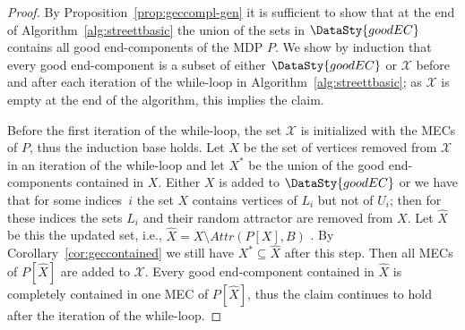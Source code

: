 \documentclass[11pt,letterpaper]{article}
\newcommand{\at}{\mathit{Attr}}
\newcommand{\mdp}{P\xspace}
\newcommand{\ec}{X\xspace}
\newcommand{\good}{\DataSty{goodEC}}
\newcommand{\badv}{B\xspace}
\begin{document}
\begin{proof}
	By Proposition~\ref{prop:geccompl-gen} it is sufficient to show that at the end of 
	Algorithm~\ref{alg:streettbasic} the union of the sets in $\good$ contains
	all good end-components of the MDP $\mdp$. We show by induction that 
	every good end-component is a subset of either 
	$\good$ or $\mathcal{\ec}$ before and after each iteration of the while-loop
	in Algorithm~\ref{alg:streettbasic}; as $\mathcal{\ec}$ is empty at the 
	end of the algorithm, this implies the claim.
	
	Before the first iteration of the while-loop, the 
	set $\mathcal{\ec}$ is initialized with the MECs of $\mdp$, thus the induction 
	base holds. Let $\ec$ be the set of vertices removed from $\mathcal{\ec}$ in 
	an iteration of the while-loop and let ${\ec}^*$ be the union of the 
	good end-components contained in $\ec$. Either $\ec$ is added to $\good$ or 
	we have that for some indices~$i$ the set $\ec$ contains vertices of 
	$L_i$ but not of $U_i$; then for these indices the sets $L_i$ and their 
	random attractor are removed from $\ec$. 
	Let $\hat\ec$ be this the updated set, i.e., $\hat\ec= \ec \setminus \at(\mdp[\ec], \badv)$ .
	By Corollary~\ref{cor:geccontained} 
	we still have ${\ec}^* \subseteq \hat{\ec}$ after this step. Then all 
	MECs of $\mdp[\hat{\ec}]$ 
	are added to $\mathcal{\ec}$.
	Every good end-component contained in $\hat{\ec}$ is completely contained 
	in one MEC of $\mdp[\hat{\ec}]$, thus the claim continues to hold after the iteration
	of the while-loop.
\end{proof}
\end{document}
